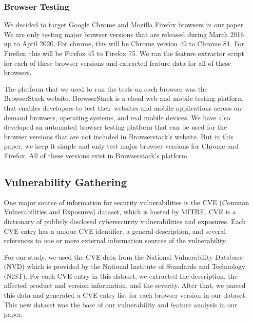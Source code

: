 \subsubsection{Browser Testing}

We decided to target Google Chrome and Mozilla Firefox browsers in our paper. We are only testing major browser versions that are released during March 2016 up to April 2020. For chrome, this will be Chrome version 49 to Chrome 81. For Firefox, this will be Firefox 45 to Firefox 75. We ran the feature extractor script for each of these browser versions and extracted feature data for all of these browsers.


The platform that we used to run the tests on each browser was the BrowserStack website. BrowserStack is a cloud web and mobile testing platform that enables developers to test their websites and mobile applications across on-demand browsers, operating systems, and real mobile devices.
We have also developed an automated browser testing platform that can be used for the browser versions that are not included in Browserstack's website. But in this paper, we keep it simple and only test major browser versions for Chrome and Firefox. All of these versions exist in Browserstack's platform.


\subsection{Vulnerability Gathering}
One major source of information for security vulnerabilities is the CVE (Common Vulnerabilities and Exposures) dataset,
which is hosted by MITRE. CVE is a dictionary of publicly disclosed cybersecurity vulnerabilities and exposures. Each CVE entry
has a unique CVE identifier, a general description, and several references to one or more external information sources of
the vulnerability.

For our study, we used the CVE data from the National Vulnerability Database
(NVD) which is provided by the National Institute of Standards and Technology (NIST).
For each CVE entry in this dataset, we extracted the description, the affected product and version information, and the severity. After that, we parsed this data and generated a CVE entry list for each browser version in our dataset. This new dataset was the base of our vulnerability and feature analysis in our paper.

